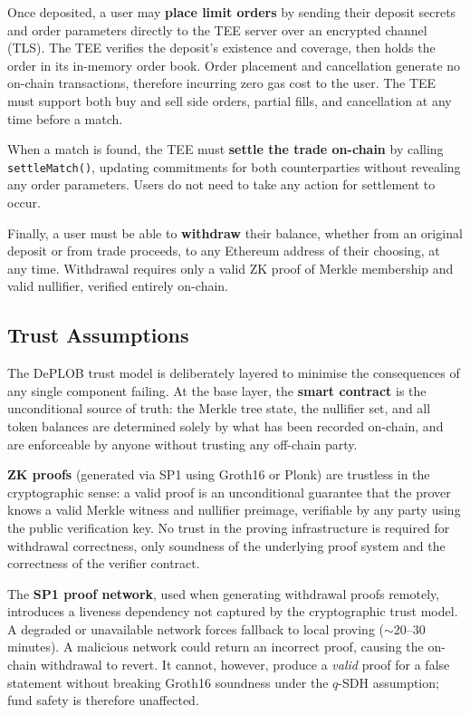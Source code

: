 \documentclass[12pt,a4paper]{article}
\begin{document}
Once deposited, a user may \textbf{place limit orders} by sending their deposit secrets and order parameters directly to the TEE server over an encrypted channel (TLS). The TEE verifies the deposit's existence and coverage, then holds the order in its in-memory order book. Order placement and cancellation generate no on-chain transactions, therefore incurring zero gas cost to the user. The TEE must support both buy and sell side orders, partial fills, and cancellation at any time before a match.

When a match is found, the TEE must \textbf{settle the trade on-chain} by calling \texttt{settleMatch()}, updating commitments for both counterparties without revealing any order parameters. Users do not need to take any action for settlement to occur.

Finally, a user must be able to \textbf{withdraw} their balance, whether from an original deposit or from trade proceeds, to any Ethereum address of their choosing, at any time. Withdrawal requires only a valid ZK proof of Merkle membership and valid nullifier, verified entirely on-chain.

\subsection{Trust Assumptions}

The DePLOB trust model is deliberately layered to minimise the consequences of any single component failing. At the base layer, the \textbf{smart contract} is the unconditional source of truth: the Merkle tree state, the nullifier set, and all token balances are determined solely by what has been recorded on-chain, and are enforceable by anyone without trusting any off-chain party.

\textbf{ZK proofs} (generated via SP1 using Groth16 or Plonk) are trustless in the cryptographic sense: a valid proof is an unconditional guarantee that the prover knows a valid Merkle witness and nullifier preimage, verifiable by any party using the public verification key. No trust in the proving infrastructure is required for withdrawal correctness, only soundness of the underlying proof system and the correctness of the verifier contract.

The \textbf{SP1 proof network}, used when generating withdrawal proofs remotely, introduces a liveness dependency not captured by the cryptographic trust model. A degraded or unavailable network forces fallback to local proving (${\sim}$20--30 minutes). A malicious network could return an incorrect proof, causing the on-chain withdrawal to revert. It cannot, however, produce a \emph{valid} proof for a false statement without breaking Groth16 soundness under the $q$-SDH assumption; fund safety is therefore unaffected. 
\end{document}
